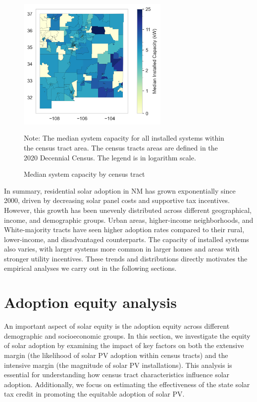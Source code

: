 \documentclass[12pt,twoside,letterpaper]{article}
\begin{document}
\begin{figure}[!ht]
    \centering
\includegraphics[width=0.65\textwidth]{figures/tract_median_capacity_map.png}
    \caption{Median system capacity by census tract}
    \label{fig:median_cap_map}
        \begin{flushleft}
        \footnotesize Note: The median system capacity for all installed systems within the census tract area. The census tracts areas are defined in the 2020 Decennial Census. The legend is in logarithm scale. 
    \end{flushleft}
\end{figure}


In summary, residential solar adoption in NM has grown exponentially since 2000, driven by decreasing solar panel costs and supportive tax incentives. However, this growth has been unevenly distributed across different geographical, income, and demographic groups. Urban areas, higher-income neighborhoods, and White-majority tracts have seen higher adoption rates compared to their rural, lower-income, and disadvantaged counterparts. The capacity of installed systems also varies, with larger systems more common in larger homes and areas with stronger utility incentives. These trends and distributions directly motivates the empirical analyses we carry out in the following sections.


\section{Adoption equity analysis}
\label{sec:adoption_equity}

An important aspect of solar equity is the adoption equity across different demographic and socioeconomic groups. In this section, we investigate the equity of solar adoption by examining the impact of key factors on both the extensive margin (the likelihood of solar PV adoption within census tracts) and the intensive margin (the magnitude of solar PV installations). This analysis is essential for understanding how census tract characteristics influence solar adoption. Additionally, we focus on estimating the effectiveness of the state solar tax credit in promoting the equitable adoption of solar PV.
\end{document}
